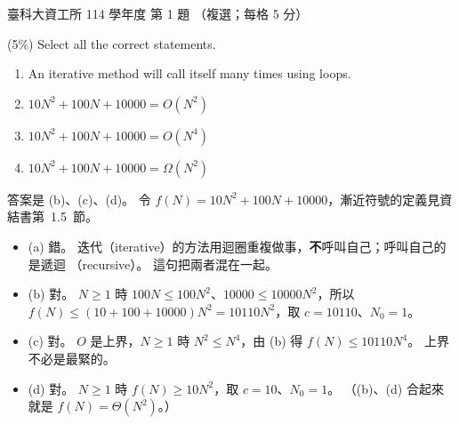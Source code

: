 \begin{pastexam}[label={px:ntust-114-ice-01}]{臺科大資工所 114 學年度 第 1 題}
（複選；每格 5 分）

(5\%) Select all the correct statements.
\begin{enumerate}[label=(\alph*)]
\item An iterative method will call itself many times using loops.
\item $10N^2+100N+10000=O(N^2)$
\item $10N^2+100N+10000=O(N^4)$
\item $10N^2+100N+10000=\Omega(N^2)$
\end{enumerate}
\end{pastexam}

\begin{pastsoln}
答案是 (b)、(c)、(d)。 令 $f(N) = 10N^2 + 100N + 10000$，漸近符號的定義見資結書第~1.5~節。
\begin{itemize}
\item (a) 錯。 迭代（iterative）的方法用迴圈重複做事，\textbf{不}呼叫自己；呼叫自己的是遞迴
（recursive）。 這句把兩者混在一起。
\item (b) 對。 $N \ge 1$ 時 $100N \le 100N^2$、$10000 \le 10000N^2$，所以
$f(N) \le (10 + 100 + 10000)N^2 = 10110N^2$，取 $c = 10110$、$N_0 = 1$。
\item (c) 對。 $O$ 是上界，$N \ge 1$ 時 $N^2 \le N^4$，由 (b) 得 $f(N) \le 10110N^4$。 上界不必是最緊的。
\item (d) 對。 $N \ge 1$ 時 $f(N) \ge 10N^2$，取 $c = 10$、$N_0 = 1$。 （(b)、(d) 合起來就是
$f(N) = \Theta(N^2)$。）
\end{itemize}
\end{pastsoln}
